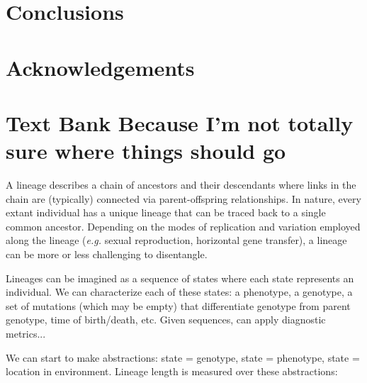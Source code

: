 \documentclass[letterpaper]{article}
\begin{document}

\section{Conclusions}

\section{Acknowledgements}


\footnotesize



\section{Text Bank Because I'm not totally sure where things should go}
A lineage describes a chain of ancestors and their descendants where links in the chain are (typically) connected via parent-offspring relationships. In nature, every extant individual has a unique lineage that can be traced back to a single common ancestor. Depending on the modes of replication and variation employed along the lineage (\textit{e.g.} sexual reproduction, horizontal gene transfer), a lineage can be more or less challenging to disentangle. 

Lineages can be imagined as a sequence of states where each state represents an individual. We can characterize each of these states: a phenotype, a genotype, a set of mutations (which may be empty) that differentiate genotype from parent genotype, time of birth/death, etc. 
Given sequences, can apply diagnostic metrics...

We can start to make abstractions: state = genotype, state = phenotype, state = location in environment.
Lineage length is measured over these abstractions:
\end{document}
